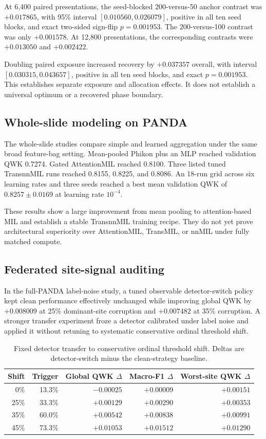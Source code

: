 \documentclass[10pt]{article}
\begin{document}
At 6,400 paired presentations, the seed-blocked 200-versus-50 anchor contrast was $+0.017865$, with 95\% interval $[0.010560,0.026079]$, positive in all ten seed blocks, and exact two-sided sign-flip $p=0.001953$. The 200-versus-100 contrast was only $+0.001578$. At 12,800 presentations, the corresponding contrasts were $+0.013050$ and $+0.002422$.

Doubling paired exposure increased recovery by $+0.037357$ overall, with interval $[0.030315,0.043657]$, positive in all ten seed blocks, and exact $p=0.001953$. This establishes separate exposure and allocation effects. It does not establish a universal optimum or a recovered phase boundary.

\subsection{Whole-slide modeling on PANDA}
The whole-slide studies compare simple and learned aggregation under the same broad feature-bag setting. Mean-pooled Phikon plus an MLP reached validation QWK 0.7274. Gated AttentionMIL reached 0.8100. Three listed tuned TransnnMIL runs reached 0.8155, 0.8225, and 0.8086. An 18-run grid across six learning rates and three seeds reached a best mean validation QWK of $0.8257\pm0.0169$ at learning rate $10^{-4}$.

These results show a large improvement from mean pooling to attention-based MIL and establish a stable TransnnMIL training recipe. They do not yet prove architectural superiority over AttentionMIL, TransMIL, or nnMIL under fully matched compute.

\subsection{Federated site-signal auditing}
In the full-PANDA label-noise study, a tuned observable detector-switch policy kept clean performance effectively unchanged while improving global QWK by $+0.008009$ at 25\% dominant-site corruption and $+0.007482$ at 35\% corruption. A stronger transfer experiment froze a detector calibrated under label noise and applied it without retuning to systematic conservative ordinal threshold shift.

\begin{table}[t]
\centering
\caption{Fixed detector transfer to conservative ordinal threshold shift. Deltas are detector-switch minus the clean-strategy baseline.}
\small
\begin{tabular}{rrrrr}
\toprule
Shift & Trigger & Global QWK $\Delta$ & Macro-F1 $\Delta$ & Worst-site QWK $\Delta$ \\
\midrule
0\% & 13.3\% & $-0.00025$ & $+0.00009$ & $+0.00151$ \\
25\% & 33.3\% & $+0.00129$ & $+0.00290$ & $+0.00353$ \\
35\% & 60.0\% & $+0.00542$ & $+0.00838$ & $+0.00991$ \\
45\% & 73.3\% & $+0.01053$ & $+0.01512$ & $+0.01290$ \\
\bottomrule
\end{tabular}
\label{tab:main_detector_transfer}
\end{table}
\end{document}
